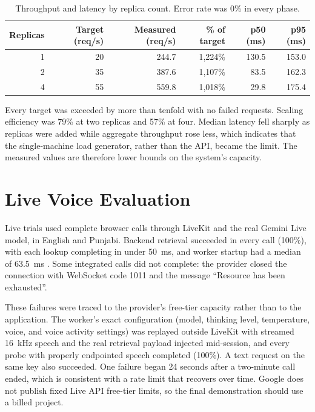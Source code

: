\documentclass[11pt,a4paper,oneside]{report}
\begin{document}
\begin{table}[htbp]
\centering\small
\begin{tabular}{@{}rrrrrr@{}}
\toprule
\textbf{Replicas} & \textbf{Target (req/s)} & \textbf{Measured (req/s)} &
  \textbf{\% of target} & \textbf{p50 (ms)} & \textbf{p95 (ms)} \\
\midrule
1 & 20 & 244.7 & 1,224\% & 130.5 & 153.0 \\
2 & 35 & 387.6 & 1,107\% & 83.5 & 162.3 \\
4 & 55 & 559.8 & 1,018\% & 29.8 & 175.4 \\
\bottomrule
\end{tabular}
\caption{Throughput and latency by replica count. Error rate was 0\% in every phase.}
\label{tab:throughput}
\end{table}

Every target was exceeded by more than tenfold with no failed requests. Scaling
efficiency was 79\% at two replicas and 57\% at four. Median latency fell sharply
as replicas were added while aggregate throughput rose less, which indicates that
the single-machine load generator, rather than the API, became the limit. The
measured values are therefore lower bounds on the system's capacity.

\section{Live Voice Evaluation}
Live trials used complete browser calls through LiveKit and the real Gemini Live
model, in English and Punjabi. Backend retrieval succeeded in every call (100\%),
with each lookup completing in under 50~ms, and worker startup had a median of
63.5~ms \cite{voice-design}. Some integrated calls did not complete: the provider
closed the connection with WebSocket code 1011 and the message ``Resource has been
exhausted''.

These failures were traced to the provider's free-tier capacity rather than to the
application. The worker's exact configuration (model, thinking level,
temperature, voice, and voice activity settings) was replayed outside LiveKit with
streamed 16~kHz speech and the real retrieval payload injected mid-session, and
every probe with properly endpointed speech completed (100\%). A text request on
the same key also succeeded. One failure began 24 seconds after a two-minute call
ended, which is consistent with a rate limit that recovers over time. Google does not publish fixed
Live API free-tier limits, so the final demonstration should use a billed project.
\end{document}
